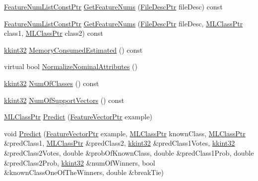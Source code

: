 \begin{DoxyCompactItemize}
\item 
\hyperlink{namespace_k_k_m_l_l_a81284b0a14973267260023f9a72da94a}{Feature\+Num\+List\+Const\+Ptr} \hyperlink{class_k_k_m_l_l_1_1_s_v_m_model_acf508af9c282adcbc835fd3a2b4d5367}{Get\+Feature\+Nums} (\hyperlink{namespace_k_k_m_l_l_aa0d0b6ab4ec18868a399b8455b05d914}{File\+Desc\+Ptr} file\+Desc) const 
\item 
\hyperlink{namespace_k_k_m_l_l_a81284b0a14973267260023f9a72da94a}{Feature\+Num\+List\+Const\+Ptr} \hyperlink{class_k_k_m_l_l_1_1_s_v_m_model_ac5739bfdfcecf78305685b4dcd4b6f7a}{Get\+Feature\+Nums} (\hyperlink{namespace_k_k_m_l_l_aa0d0b6ab4ec18868a399b8455b05d914}{File\+Desc\+Ptr} file\+Desc, \hyperlink{namespace_k_k_m_l_l_ac272393853d59e72e8456f14cd6d8c23}{M\+L\+Class\+Ptr} class1, \hyperlink{namespace_k_k_m_l_l_ac272393853d59e72e8456f14cd6d8c23}{M\+L\+Class\+Ptr} class2) const 
\item 
\hyperlink{namespace_k_k_b_a8fa4952cc84fda1de4bec1fbdd8d5b1b}{kkint32} \hyperlink{class_k_k_m_l_l_1_1_s_v_m_model_a9d8a81b1c6179ac1b0bd7ddbf8df03a3}{Memory\+Consumed\+Estimated} () const 
\item 
virtual bool \hyperlink{class_k_k_m_l_l_1_1_s_v_m_model_a5ad268eac9df140b1010acf98ed2adef}{Normalize\+Nominal\+Attributes} ()
\item 
\hyperlink{namespace_k_k_b_a8fa4952cc84fda1de4bec1fbdd8d5b1b}{kkint32} \hyperlink{class_k_k_m_l_l_1_1_s_v_m_model_a4a5e677c7fda9a28aec7a420966110be}{Num\+Of\+Classes} () const 
\item 
\hyperlink{namespace_k_k_b_a8fa4952cc84fda1de4bec1fbdd8d5b1b}{kkint32} \hyperlink{class_k_k_m_l_l_1_1_s_v_m_model_af26af0c1556652910367e6ecbbfad390}{Num\+Of\+Support\+Vectors} () const 
\item 
\hyperlink{namespace_k_k_m_l_l_ac272393853d59e72e8456f14cd6d8c23}{M\+L\+Class\+Ptr} \hyperlink{class_k_k_m_l_l_1_1_s_v_m_model_a76b4316914f1f272d61010477e41d7f6}{Predict} (\hyperlink{namespace_k_k_m_l_l_a0c5df3d48f45926fbc4fee04f5e3bc04}{Feature\+Vector\+Ptr} example)
\item 
void \hyperlink{class_k_k_m_l_l_1_1_s_v_m_model_acd0c5d26be6a926aebe0bb28e23ae188}{Predict} (\hyperlink{namespace_k_k_m_l_l_a0c5df3d48f45926fbc4fee04f5e3bc04}{Feature\+Vector\+Ptr} example, \hyperlink{namespace_k_k_m_l_l_ac272393853d59e72e8456f14cd6d8c23}{M\+L\+Class\+Ptr} known\+Class, \hyperlink{namespace_k_k_m_l_l_ac272393853d59e72e8456f14cd6d8c23}{M\+L\+Class\+Ptr} \&pred\+Class1, \hyperlink{namespace_k_k_m_l_l_ac272393853d59e72e8456f14cd6d8c23}{M\+L\+Class\+Ptr} \&pred\+Class2, \hyperlink{namespace_k_k_b_a8fa4952cc84fda1de4bec1fbdd8d5b1b}{kkint32} \&pred\+Class1\+Votes, \hyperlink{namespace_k_k_b_a8fa4952cc84fda1de4bec1fbdd8d5b1b}{kkint32} \&pred\+Class2\+Votes, double \&prob\+Of\+Known\+Class, double \&pred\+Class1\+Prob, double \&pred\+Class2\+Prob, \hyperlink{namespace_k_k_b_a8fa4952cc84fda1de4bec1fbdd8d5b1b}{kkint32} \&num\+Of\+Winners, bool \&known\+Class\+One\+Of\+The\+Winners, double \&break\+Tie)

\end{DoxyCompactItemize}
